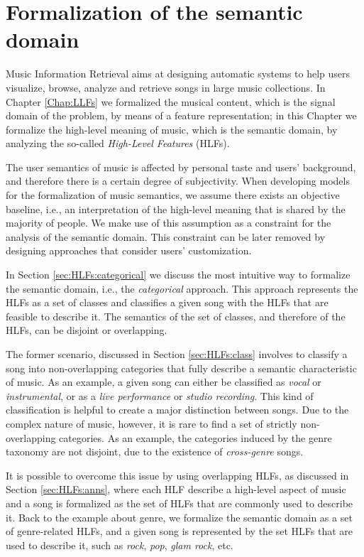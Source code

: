 \chapter{Formalization of the semantic domain}
\label{Chap:HLFs}
Music Information Retrieval aims at designing automatic systems to help users visualize, browse, analyze and retrieve songs in large music collections. In Chapter \ref{Chap:LLFs} we formalized the musical content, which is the signal domain of the problem, by means of a feature representation; in this Chapter we formalize the high-level meaning of music, which is the semantic domain, by analyzing the so-called \textit{High-Level Features} (HLFs). 

The user semantics of music is affected by personal taste and users' background, and therefore there is a certain degree of subjectivity. When developing models for the formalization of music semantics, we assume there exists an objective baseline, i.e., an interpretation of the high-level meaning that is shared by the majority of people. We make use of this assumption as a constraint for the analysis of the semantic domain. This constraint can be later removed by designing approaches that consider users' customization.

In Section \ref{sec:HLFs:categorical} we discuss the most intuitive way to formalize the semantic domain, i.e., the \textit{categorical} approach. This approach represents the HLFs as a set of classes and classifies a given song with the HLFs that are feasible to describe it. The semantics of the set of classes, and therefore of the HLFs, can be disjoint or overlapping.

The former scenario, discussed in Section \ref{sec:HLFs:class} involves to classify a song into non-overlapping categories that fully describe a semantic characteristic of music. As an example, a given song can either be classified as \textit{vocal} or \textit{instrumental}, or as a \textit{live performance} or \textit{studio recording}. This kind of classification is helpful to create a major distinction between songs. Due to the complex nature of music, however, it is rare to find a set of strictly non-overlapping categories. As an example, the categories induced by the genre taxonomy are not disjoint, due to the existence of \textit{cross-genre} songs.

It is possible to overcome this issue by using overlapping HLFs, as discussed in Section \ref{sec:HLFs:anns}, where each HLF describe a high-level aspect of music and a song is formalized as the set of HLFs that are commonly used to describe it. Back to the example about genre, we formalize the semantic domain as a set of genre-related HLFs, and a given song is represented by the set HLFs that are used to describe it, such as \textit{rock}, \textit{pop}, \textit{glam rock}, etc. 

